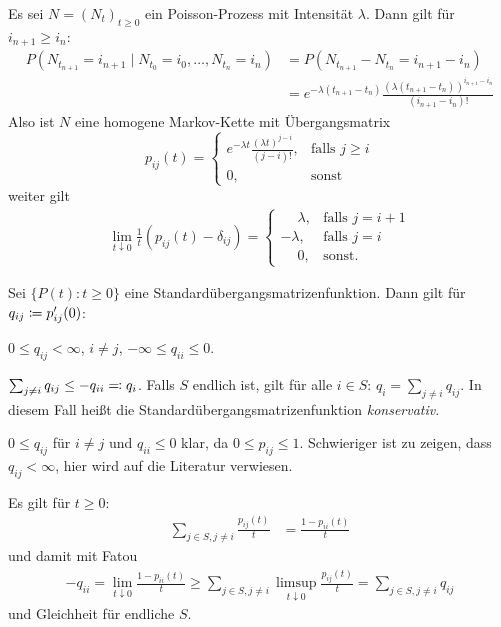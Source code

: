 \documentclass[a4paper,twoside,DIV15,BCOR12mm]{scrbook}
\begin{document}
\begin{beispiel}
Es sei $N=(N_t)_{t\ge 0}$ ein Poisson-Prozess mit Intensität $\lambda$. Dann gilt für $i_{n+1}\ge i_n$:
\begin{align*}
P(N_{t_{n+1}} = i_{n+1} \mid N_{t_0} = i_0 ,\ldots,N_{t_n}=i_n)
&= P(N_{t_{n+1}} - N_{t_n} = i_{n+1} - i_n)\\
&= e^{-\lambda (t_{n+1}-t_n)}\frac{(\lambda(t_{n+1}-t_n))^{i_{n+1}-i_n}}{(i_{n+1}-i_n)!}
\end{align*}
Also ist $N$ eine homogene Markov-Kette mit Übergangsmatrix
\[
p_{ij}(t) = 
\begin{cases}
e^{-\lambda t}\frac{(\lambda t)^{j-i}}{(j-i)!}, &\text{falls }j\ge i \\
0,&\text{sonst}
\end{cases}
\]
weiter gilt 
\begin{align*}
\lim_{t\downarrow 0} \frac 1t(p_{ij}(t) - \delta_{ij}) =
\begin{cases}
\phantom{-}\lambda,&\text{falls }j=i+1 \\
-\lambda, &\text{falls }j=i \\
\phantom{-}0, &\text{sonst.}
\end{cases}
\end{align*}
\end{beispiel}

\begin{lemma}
Sei $\{P(t):t\ge 0\}$ eine Standardübergangsmatrizenfunktion. Dann gilt für $q_{ij} \da p_{ij}'(0)$:
\begin{enuma}
\item $0\le q_{ij} < \infty$, $i\ne j$, $-\infty \le  q_{ii} \le 0$.
\item $\sum_{j\ne i} q_{ij} \le -q_{ii} \ad q_i$. Falls $S$ endlich ist, gilt für alle $i\in S$: $q_i = \sum_{j\ne i} q_{ij}$. In diesem Fall heißt die Standardübergangsmatrizenfunktion \emph{konservativ}.
\end{enuma}
\end{lemma}

\begin{beweis}
\begin{enuma}
\item $0\le q_{ij}$ für $i\ne j$ und $q_{ii} \le 0$ klar, da $0\le p_{ij} \le 1$. Schwieriger ist zu zeigen, dass $q_{ij}<\infty$, hier wird auf die Literatur verwiesen.
\item  Es gilt für $t\ge 0$:
\begin{align*}
\sum_{j\in S,j\ne i} \frac {p_{ij}(t)}t &= \frac{1-p_{ii}(t)}t 
\end{align*}
und damit mit Fatou
\begin{align*}
-q_{ii} = \lim_{t\downarrow 0}  \frac{1-p_{ii}(t)}t 
\ge \sum_{j\in S,j\ne i} \limsup_{t\downarrow 0} \frac{p_{ij}(t)}{t} = \sum_{j\in S,j\ne i} q_{ij}
\end{align*}
und Gleichheit für endliche $S$.
\end{enuma}
\end{beweis}
\end{document}
